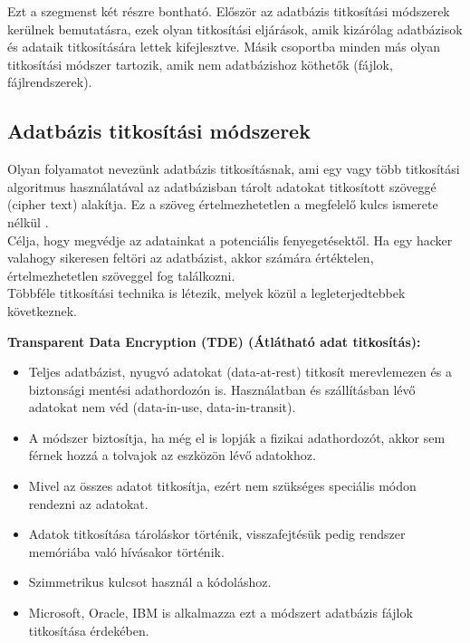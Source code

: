 \newpage
{}

Ezt a szegmenst két részre bontható. Először az adatbázis titkosítási módszerek kerülnek bemutatásra, ezek olyan titkosítási eljárások, amik kizárólag adatbázisok és adataik titkosítására lettek kifejlesztve. Másik csoportba minden más olyan titkosítási módszer tartozik, amik nem adatbázishoz köthetők (fájlok, fájlrendszerek).

\subsection{Adatbázis titkosítási módszerek} 

Olyan folyamatot nevezünk adatbázis titkosításnak, ami egy vagy több titkosítási algoritmus használatával az adatbázisban tárolt adatokat titkosított szöveggé (cipher text) alakítja. Ez a szöveg értelmezhetetlen a megfelelő kulcs ismerete nélkül \cite{bouganim2009database}.
\\Célja, hogy megvédje az adatainkat a potenciális fenyegetésektől. Ha egy hacker valahogy sikeresen feltöri az adatbázist, akkor számára értéktelen, értelmezhetetlen szöveggel fog találkozni.
\\Többféle titkosítási technika is létezik, melyek közül a legleterjedtebbek következnek.\newline

\noindent\textbf{Transparent Data Encryption (TDE) (Átlátható adat titkosítás):}\newline
\begin{itemize}
	\item Teljes adatbázist, nyugvó adatokat (data-at-rest) titkosít merevlemezen és a biztonsági mentési adathordozón is. Használatban és szállításban lévő adatokat nem véd (data-in-use, data-in-transit).
	\item A módszer biztosítja, ha még el is lopják a fizikai adathordozót, akkor sem férnek hozzá a tolvajok az eszközön lévő adatokhoz.
	\item Mivel az összes adatot titkosítja, ezért nem szükséges speciális módon rendezni az adatokat.
	\item Adatok titkosítása tároláskor történik, visszafejtésük pedig rendszer memóriába való hívásakor történik.
	\item Szimmetrikus kulcsot használ a kódoláshoz.
	\item Microsoft, Oracle, IBM is alkalmazza ezt a módszert adatbázis fájlok titkosítása érdekében.
\end{itemize}


